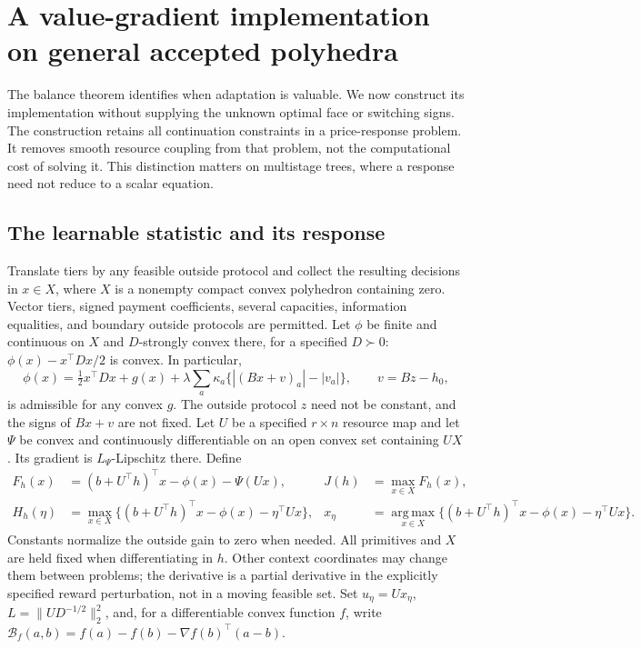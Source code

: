 \documentclass[11pt,letterpaper]{article}
\theoremstyle{definition}
\newcommand{\1}{\mathbf 1}
\newcommand{\argmax}{\operatorname*{arg\,max}}
\begin{document}


\section{A value-gradient implementation on general accepted polyhedra}\label{sec:r19-bridge}
The balance theorem identifies when adaptation is valuable. We now construct its implementation without supplying the unknown optimal face or switching signs. The construction retains all continuation constraints in a price-response problem. It removes smooth resource coupling from that problem, not the computational cost of solving it. This distinction matters on multistage trees, where a response need not reduce to a scalar equation.

\subsection{The learnable statistic and its response}
Translate tiers by any feasible outside protocol and collect the resulting decisions in $x\in X$, where $X$ is a nonempty compact convex polyhedron containing zero. Vector tiers, signed payment coefficients, several capacities, information equalities, and boundary outside protocols are permitted. Let $\phi$ be finite and continuous on $X$ and $D$-strongly convex there, for a specified $D\succ0$: $\phi(x)-x^\top Dx/2$ is convex. In particular,
\[
 \phi(x)=\tfrac12x^\top Dx+g(x)
       +\lambda\sum_a\kappa_a\{|(Bx+v)_a|-|v_a|\},
 \qquad v=Bz-h_0,
\]
is admissible for any convex $g$. The outside protocol $z$ need not be constant, and the signs of $Bx+v$ are not fixed. Let $U$ be a specified $r\times n$ resource map and let $\Psi$ be convex and continuously differentiable on an open convex set containing $UX$. Its gradient is $L_\Psi$-Lipschitz there. Define
\begin{align}
 F_h(x)&=(b+U^\top h)^\top x-\phi(x)-\Psi(Ux), &
 J(h)&=\max_{x\in X}F_h(x),\label{eq:r19-program}\\
 H_h(\eta)&=\max_{x\in X}\{(b+U^\top h)^\top x-\phi(x)-\eta^\top Ux\},&
 x_\eta&=\argmax_{x\in X}\{(b+U^\top h)^\top x-\phi(x)-\eta^\top Ux\}.
 \label{eq:r19-response}
\end{align}
Constants normalize the outside gain to zero when needed. All primitives and $X$ are held fixed when differentiating in $h$. Other context coordinates may change them between problems; the derivative is a partial derivative in the explicitly specified reward perturbation, not in a moving feasible set. Set $u_\eta=Ux_\eta$, $L=\|UD^{-1/2}\|_2^2$, and, for a differentiable convex function $f$, write
$\mathcal B_f(a,b)=f(a)-f(b)-\nabla f(b)^\top(a-b)$.
\end{document}
